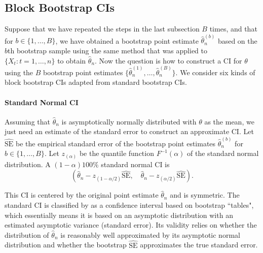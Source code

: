 \documentclass[10pt]{article}
\newcommand{\eds}[1]{\textcolor{red}{EDS: (#1)}}
\newcommand{\mc}[1]{\textcolor{orange}{MC: (#1)}}
\begin{document}
\subsection*{Block Bootstrap CIs}

Suppose that we have repeated the steps in the last subsection $B$ times, and
that for $b \in \{1, \ldots, B\}$, we have obtained a bootstrap point estimate
$\hat\theta_n^{(b)}$ based on the $b$th bootstrap sample using the same method
that was applied to $\{X_t: t = 1, \ldots, n\}$ to obtain $\hat\theta_n$. Now
the question is how to construct a CI for $\theta$ using the $B$ bootstrap point 
estimates $\{\hat\theta_n^{(1)}, \ldots, \hat\theta_n^{(B)}\}$. We consider six 
kinds of block bootstrap CIs adapted from standard bootstrap CIs.


\paragraph{Standard Normal CI}
Assuming that $\hat\theta_n$ is asymptotically normally distributed with 
$\theta$ as the mean, we just need an estimate of the standard error to 
construct an approximate CI.\citep{efron1993introduction} Let
$\widehat{\text{SE}}$ be the empirical standard error of the bootstrap point 
estimates $\hat\theta_n^{(b)}$ for $b \in \{1, \ldots, B\}$. Let $z_{(\alpha)}$ 
be the quantile function $F^{-1}(\alpha)$ of the standard normal distribution. 
A $(1 - \alpha)100\%$ standard normal CI is
\[
(\hat{\theta}_{n} - z_{(1-\alpha/2)}\widehat{\text{SE}}, \quad
\hat{\theta}_{n} - z_{(\alpha/2)}\widehat{\text{SE}}).
\]

This CI is centered by the original point estimate $\hat\theta_n$ and is 
symmetric. The standard CI is classified by \citet{efron1993introduction} 
as a confidence interval based on bootstrap ``tables", which essentially means 
it is based on an asymptotic 
distribution with an estimated asymptotic variance (standard error). Its 
validity relies on whether the distribution of $\hat\theta_n$ is reasonably well 
approximated by its asymptotic normal distribution and whether the bootstrap
$\widehat{\text{SE}}$ approximates the true standard error.
\end{document}

